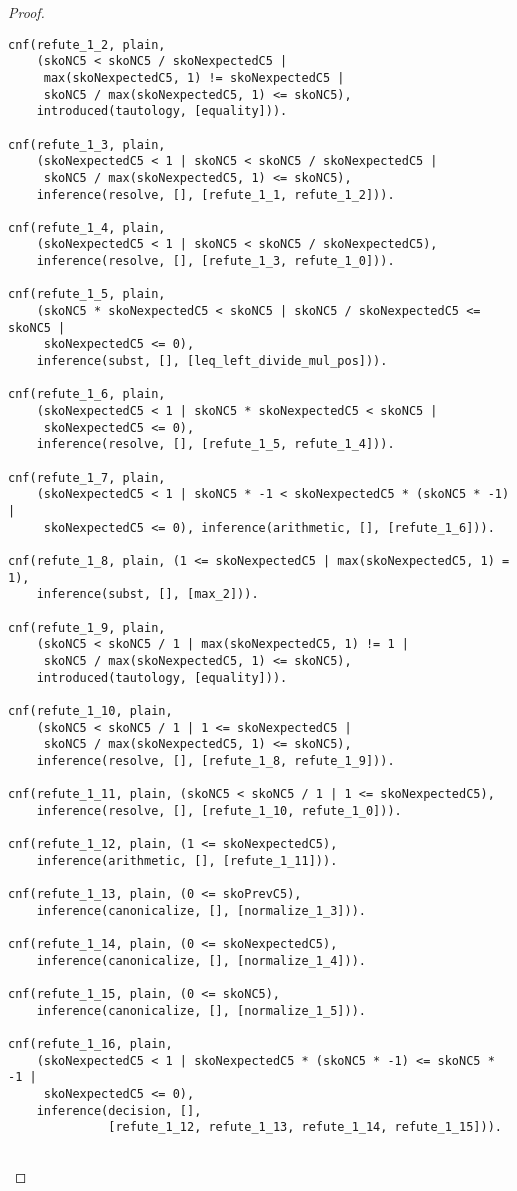 \begin{proof}
\begin{verbatim}
cnf(refute_1_2, plain,
    (skoNC5 < skoNC5 / skoNexpectedC5 |
     max(skoNexpectedC5, 1) != skoNexpectedC5 |
     skoNC5 / max(skoNexpectedC5, 1) <= skoNC5),
    introduced(tautology, [equality])).

cnf(refute_1_3, plain,
    (skoNexpectedC5 < 1 | skoNC5 < skoNC5 / skoNexpectedC5 |
     skoNC5 / max(skoNexpectedC5, 1) <= skoNC5),
    inference(resolve, [], [refute_1_1, refute_1_2])).

cnf(refute_1_4, plain,
    (skoNexpectedC5 < 1 | skoNC5 < skoNC5 / skoNexpectedC5),
    inference(resolve, [], [refute_1_3, refute_1_0])).

cnf(refute_1_5, plain,
    (skoNC5 * skoNexpectedC5 < skoNC5 | skoNC5 / skoNexpectedC5 <= skoNC5 |
     skoNexpectedC5 <= 0),
    inference(subst, [], [leq_left_divide_mul_pos])).

cnf(refute_1_6, plain,
    (skoNexpectedC5 < 1 | skoNC5 * skoNexpectedC5 < skoNC5 |
     skoNexpectedC5 <= 0),
    inference(resolve, [], [refute_1_5, refute_1_4])).

cnf(refute_1_7, plain,
    (skoNexpectedC5 < 1 | skoNC5 * -1 < skoNexpectedC5 * (skoNC5 * -1) |
     skoNexpectedC5 <= 0), inference(arithmetic, [], [refute_1_6])).

cnf(refute_1_8, plain, (1 <= skoNexpectedC5 | max(skoNexpectedC5, 1) = 1),
    inference(subst, [], [max_2])).

cnf(refute_1_9, plain,
    (skoNC5 < skoNC5 / 1 | max(skoNexpectedC5, 1) != 1 |
     skoNC5 / max(skoNexpectedC5, 1) <= skoNC5),
    introduced(tautology, [equality])).

cnf(refute_1_10, plain,
    (skoNC5 < skoNC5 / 1 | 1 <= skoNexpectedC5 |
     skoNC5 / max(skoNexpectedC5, 1) <= skoNC5),
    inference(resolve, [], [refute_1_8, refute_1_9])).

cnf(refute_1_11, plain, (skoNC5 < skoNC5 / 1 | 1 <= skoNexpectedC5),
    inference(resolve, [], [refute_1_10, refute_1_0])).

cnf(refute_1_12, plain, (1 <= skoNexpectedC5),
    inference(arithmetic, [], [refute_1_11])).

cnf(refute_1_13, plain, (0 <= skoPrevC5),
    inference(canonicalize, [], [normalize_1_3])).

cnf(refute_1_14, plain, (0 <= skoNexpectedC5),
    inference(canonicalize, [], [normalize_1_4])).

cnf(refute_1_15, plain, (0 <= skoNC5),
    inference(canonicalize, [], [normalize_1_5])).

cnf(refute_1_16, plain,
    (skoNexpectedC5 < 1 | skoNexpectedC5 * (skoNC5 * -1) <= skoNC5 * -1 |
     skoNexpectedC5 <= 0),
    inference(decision, [],
              [refute_1_12, refute_1_13, refute_1_14, refute_1_15])).


\end{verbatim}
\end{proof}
